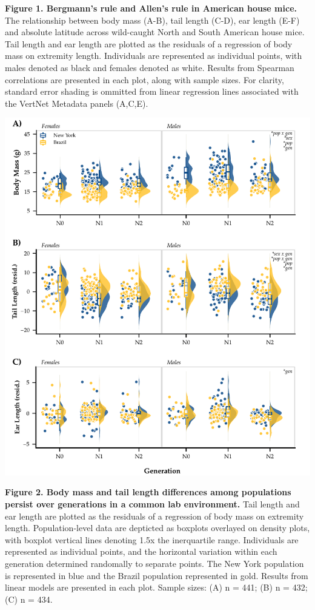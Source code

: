 \documentclass[]{article}
\begin{document}
\textbf{Figure 1. Bergmann's rule and Allen's rule in American house
mice.} The relationship between body mass (A-B), tail length (C-D), ear
length (E-F) and absolute latitude across wild-caught North and South
American house mice. Tail length and ear length are plotted as the
residuals of a regression of body mass on extremity length. Individuals
are represented as individual points, with males denoted as black and
females denoted as white. Results from Spearman correlations are
presented in each plot, along with sample sizes. For clarity, standard
error shading is ommitted from linear regression lines associated with
the VertNet Metadata panels (A,C,E).

\newpage

\includegraphics{../results/figures/Generations_colony.pdf}

\textbf{Figure 2. Body mass and tail length differences among
populations persist over generations in a common lab environment.} Tail
length and ear length are plotted as the residuals of a regression of
body mass on extremity length. Population-level data are depticted as
boxplots overlayed on density plots, with boxplot vertical lines
denoting 1.5x the inerquartile range. Individuals are represented as
individual points, and the horizontal variation within each generation
determined randomally to separate points. The New York population is
represented in blue and the Brazil population represented in gold.
Results from linear models are presented in each plot. Sample sizes: (A)
n = 441; (B) n = 432; (C) n = 434.
\end{document}
